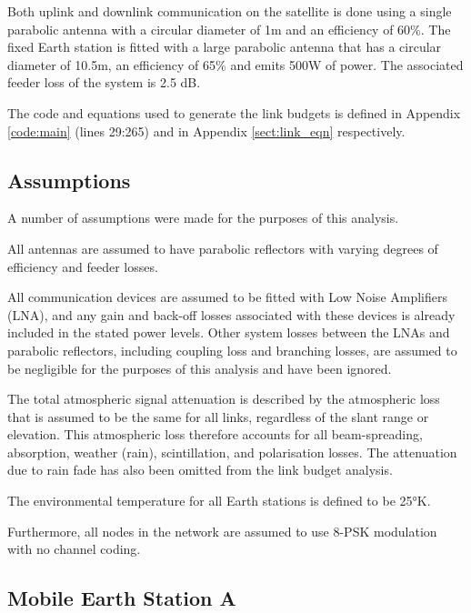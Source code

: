 \documentclass[12pt]{article}
\begin{document}
Both uplink and downlink communication on the satellite is done using a single parabolic antenna with a circular diameter of 1m and an efficiency of 60\%. The fixed Earth station is fitted with a large parabolic antenna that has a circular diameter of 10.5m, an efficiency of 65\% and emits 500W of power. The associated feeder loss of the system is 2.5 dB.

The code and equations used to generate the link budgets is defined in Appendix \ref{code:main} (lines 29:265) and in Appendix \ref{sect:link_eqn} respectively.

\subsection{Assumptions}

A number of assumptions were made for the purposes of this analysis. 

All antennas are assumed to have parabolic reflectors with varying degrees of efficiency and feeder losses. 

All communication devices are assumed to be fitted with Low Noise Amplifiers (LNA), and any gain and back-off losses associated with these devices is already included in the stated power levels. Other system losses between the LNAs and parabolic reflectors, including coupling loss and branching losses, are assumed to be negligible for the purposes of this analysis and have been ignored. 

The total atmospheric signal attenuation is described by the atmospheric loss that is assumed to be the same for all links, regardless of the slant range or elevation. This atmospheric loss therefore accounts for all beam-spreading, absorption, weather (rain), scintillation, and polarisation losses. The attenuation due to rain fade has also been omitted from the link budget analysis. 

The environmental temperature for all Earth stations is defined to be 25°K. 

Furthermore, all nodes in the network are assumed to use 8-PSK modulation with no channel coding. 


\subsection{Mobile Earth Station A}
\end{document}
